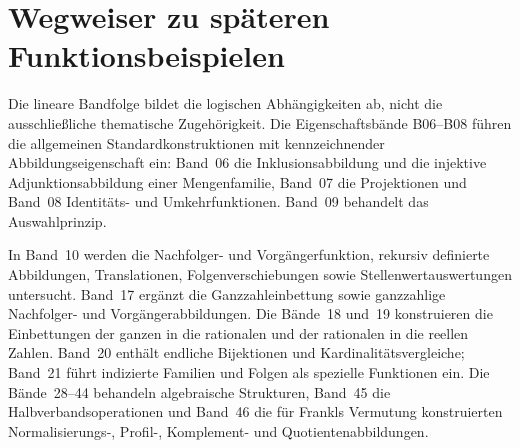 \documentclass[main.tex]{subfiles}
\begin{document}
\chapter{Wegweiser zu späteren Funktionsbeispielen}

Die lineare Bandfolge bildet die logischen Abhängigkeiten ab, nicht die
ausschließliche thematische Zugehörigkeit. Die Eigenschaftsbände B06--B08
führen die allgemeinen Standardkonstruktionen mit kennzeichnender
Abbildungseigenschaft ein: Band~06 die Inklusionsabbildung und die injektive
Adjunktionsabbildung einer Mengenfamilie, Band~07 die Projektionen und
Band~08 Identitäts- und Umkehrfunktionen. Band~09 behandelt das
Auswahlprinzip.

In Band~10 werden die Nachfolger- und Vorgängerfunktion, rekursiv definierte
Abbildungen, Translationen, Folgenverschiebungen sowie
Stellenwertauswertungen untersucht. Band~17 ergänzt die Ganzzahleinbettung
sowie ganzzahlige Nachfolger- und Vorgängerabbildungen. Die Bände~18 und~19
konstruieren die Einbettungen der ganzen in die rationalen und der rationalen
in die reellen Zahlen. Band~20 enthält endliche Bijektionen und
Kardinalitätsvergleiche; Band~21 führt indizierte Familien und Folgen als
spezielle Funktionen ein. Die Bände~28--44 behandeln algebraische
Strukturen, Band~45 die Halbverbandsoperationen und Band~46 die für Frankls
Vermutung konstruierten
Normalisierungs-, Profil-, Komplement- und Quotientenabbildungen.


\end{document}
